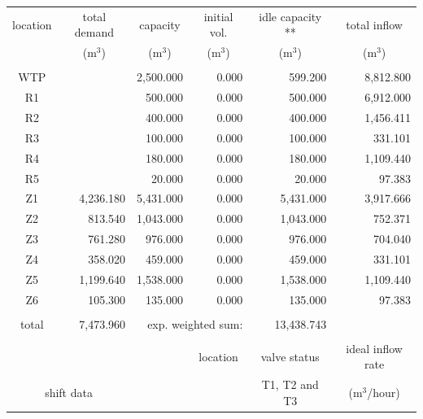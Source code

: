 \documentclass{singlecol}
\theoremstyle{TH}{
\newtheorem{lemma}{Lemma}
\newtheorem{theorem}[lemma]{Theorem}
\newtheorem{corrolary}[lemma]{Corrolary}
\newtheorem{conjecture}[lemma]{Conjecture}
\newtheorem{proposition}[lemma]{Proposition}
\newtheorem{claim}[lemma]{Claim}
\newtheorem{stheorem}[lemma]{Wrong Theorem}
\newtheorem{algorithm}{Algorithm}
}
\theoremstyle{THrm}{
\newtheorem{definition}{Definition}[section]
\newtheorem{question}{Question}[section]
\newtheorem{remark}{Remark}
\newtheorem{scheme}{Scheme}
}
\theoremstyle{THhit}{
\newtheorem{case}{Case}[section]
}
\begin{document}
\begin{table}[h!]
\begin{center}
\begin{small}
	\begin{tabular}{ c r r r r r } 
		location & \multicolumn{1}{c}{total demand}      & \multicolumn{1}{c}{capacity} & \multicolumn{1}{c}{initial vol.} & \multicolumn{1}{c}{idle capacity **} & \multicolumn{1}{c}{total inflow}  \\
		      & \multicolumn{1}{c}{($\mathrm{m^3}$)} & \multicolumn{1}{c}{($\mathrm{m^3}$)}   & \multicolumn{1}{c}{($\mathrm{m^3}$)}     &  \multicolumn{1}{c}{($\mathrm{m^3}$)}   &  \multicolumn{1}{c}{($\mathrm{m^3}$)}               \\
		\\
		WTP   &           & 2,500.000 & 0.000 &  599.200 & 8,812.800 \\
		R1    &           &   500.000 & 0.000 &  500.000 & 6,912.000\\
		R2    &           &   400.000 & 0.000 &  400.000 & 1,456.411 \\
		R3    &           &   100.000 & 0.000 &  100.000 &   331.101 \\
	    R4    &           &   180.000 & 0.000 &  180.000 & 1,109.440  \\
	    R5    &           &    20.000 & 0.000 &   20.000 &    97.383 \\
	    Z1    & 4,236.180 & 5,431.000 & 0.000 &  5,431.000 & 3,917.666 \\
	    Z2    &   813.540 & 1,043.000 & 0.000 &  1,043.000 &   752.371 \\
	    Z3    &   761.280 &   976.000 & 0.000 &    976.000 &   704.040 \\
	    Z4    &   358.020 &   459.000 & 0.000 &    459.000 &   331.101 \\
	    Z5    & 1,199.640 & 1,538.000 & 0.000 &  1,538.000 & 1,109.440 \\
	    Z6    &   105.300 &   135.000 & 0.000 &    135.000 &    97.383 \\
	    \\
	    total & 7,473.960 & \multicolumn{2}{r}{exp. weighted sum:} & 13,438.743 &              \\
		   \\
		&  &      &  \multicolumn{1}{c}{location}    & \multicolumn{1}{c}{valve status} & \multicolumn{1}{c}{ideal inflow rate}   \\
		\multicolumn{2}{c}{shift data}     &   &      & \multicolumn{1}{c}{T1, T2 and T3} & \multicolumn{1}{c}{($\mathrm{m^3}$/hour)} \\

\end{tabular}
\end{small}
\end{center}
\end{table}
\end{document}
